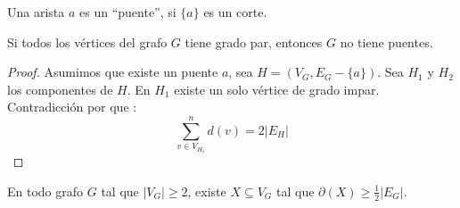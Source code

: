 \begin{definicion}
Una arista $a$ es un ``puente'', si $\{a\}$ es un corte.

\end{definicion}
\begin{teorema}
Si todos los vértices del grafo $G$ tiene grado par, entonces $G$ no tiene puentes.
\end{teorema}
\begin{proof}
Asumimos que existe un puente $a$, sea $H=(V_G,E_G-\{a\})$.
Sea $H_1$ y $H_2$ los componentes de $H$. En $H_1$ existe
un solo vértice de grado impar. Contradicción por que :
$$\sum_{v\in {V_{H_1}}}^n{d(v)}=2|E_H|$$


\end{proof}
\begin{teorema}
En todo grafo $G$ tal que $|V_G|\geq 2$, existe $X\subseteq V_G$ tal que $\partial (X)\geq\frac1{2}|E_G|$.

\end{teorema}

